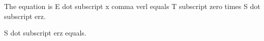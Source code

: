 The equation is E dot subscript x comma verl equals T subscript zero times S dot subscript erz.

S dot subscript erz equals.